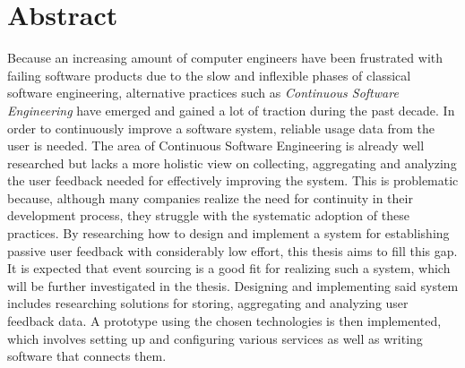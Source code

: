%
\chapter*{Abstract}
\label{sec:abstract}
\vspace*{-10mm}

Because an increasing amount of computer engineers have been frustrated with failing software products due to the slow and inflexible phases of classical software engineering, alternative practices such as \emph{Continuous Software Engineering} have emerged and gained a lot of traction during the past decade.
In order to continuously improve a software system, reliable usage data from the user is needed.
The area of Continuous Software Engineering is already well researched but lacks a more holistic view on collecting, aggregating and analyzing the user feedback needed for effectively improving the system.
This is problematic because, although many companies realize the need for continuity in their development process, they struggle with the systematic adoption of these practices.
By researching how to design and implement a system for establishing passive user feedback with considerably low effort, this thesis aims to fill this gap.
It is expected that event sourcing is a good fit for realizing such a system, which will be further investigated in the thesis.
Designing and implementing said system includes researching solutions for storing, aggregating and analyzing user feedback data.
A prototype using the chosen technologies is then implemented, which involves setting up and configuring various services as well as writing software that connects them.
